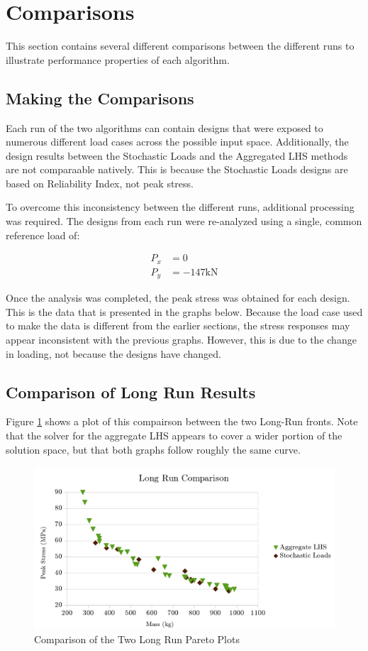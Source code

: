 \section{Comparisons}
This section contains several different comparisons between the different runs to illustrate performance properties of each algorithm. 

\subsection{Making the Comparisons}
Each run of the two algorithms can contain designs that were exposed to numerous different load cases across the possible input space. Additionally, the design results between the Stochastic Loads and the Aggregated LHS methods are not comparaable natively. This is because the Stochastic Loads designs are based on Reliability Index, not peak stress. 

To overcome this inconsistency between the different runs, additional processing was required. The designs from each run were re-analyzed using a single, common reference load of: 

\begin{align*}
P_x &=0\\
P_y &= -147 \text{kN}
\end{align*}

Once the analysis was completed, the peak stress was obtained for each design. This is the data that is presented in the graphs below. Because the load case used to make the data is different from the earlier sections, the stress responses may appear inconsistent with the previous graphs. However, this is due to the change in loading, not because the designs have changed. 

\subsection{Comparison of Long Run Results}
Figure \ref{fig:pfront_comp_long} shows a plot of this compairson between the two Long-Run fronts. Note that the solver for the aggregate LHS appears to cover a wider portion of the solution space, but that both graphs follow roughly the same curve. 

\begin{figure}[!htbp]
\includegraphics[width=\textwidth]{img/pf_comp_long.png}
\caption{Comparison of the Two Long Run Pareto Plots}
\label{fig:pfront_comp_long}
\end{figure}


